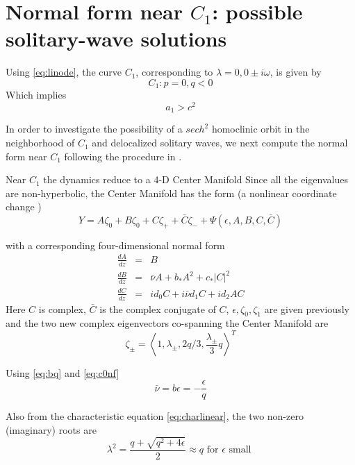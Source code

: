 \section{Normal form near $C_1$: possible solitary-wave solutions}
Using \eqref{eq:linode}, the curve $C_1$, corresponding to $\lambda = 0, 0\pm i \omega$, is given by
\begin{equation}\label{eq:c1}
C_1 : { p = 0, q < 0 }
\end{equation}
Which implies
\begin{equation}
a_1 > c^2
\end{equation}

In order to investigate the possibility of a $ sech^2 $  homoclinic orbit in the neighborhood of $C_1$ and delocalized solitary
waves, we next compute the normal form near $C_1$ following the procedure in \cite{IA}.

Near $C_1$ the dynamics reduce to a 4-D Center Manifold \cite{IA}
Since all the eigenvalues are non-hyperbolic, the Center Manifold has the form (a nonlinear coordinate change \cite{IA})
\begin{equation} \label{eq:c1cm}
Y = A \zeta_0 + B \zeta_0 + C \zeta_+ + \bar{C} \zeta_- + \Psi(\epsilon,A,B,C,\bar{C})
\end{equation}

with  a corresponding four-dimensional normal form
\begin{subequations}
\begin{eqnarray}\label{eq:c1nf}
\frac{dA}{dz} &=& B \\ \label{eq:aq}
\frac{dB}{dz} &=& \bar{\nu} A + b_* A^2 + c_* \left|C\right|^2 \\ \label{eq:bq}
\frac{dC}{dz} &=& i d_0 C + i \bar{\nu} d_1 C + i d_2 A C \label{eq:cq}
\end{eqnarray}
\end{subequations}
Here $C$ is complex, $\bar{C}$ is the complex conjugate of $C$, $\epsilon, \zeta_0, \zeta_1$ are given previously and the two new
complex eigenvectors co-spanning the Center Manifold are
\begin{equation}
\zeta_\pm	 = \left< 1, \lambda_\pm, 2 q / 3, \frac{\lambda_\pm}{3} q\right>^T 
\end{equation}

Using \eqref{eq:bq} and \eqref{eq:c0nf}
\begin{equation}
\bar{\nu} = b \epsilon = -\frac{\epsilon}{q} 
\end{equation}

Also from the characteristic equation \eqref{eq:charlinear}, the two non-zero 
(imaginary) roots are 
\begin{equation}
\lambda^2 = \frac{ q + \sqrt{q^2 + 4 \epsilon } }{2} \approx q \textrm{ for } \epsilon \textrm{ small }
\end{equation}

